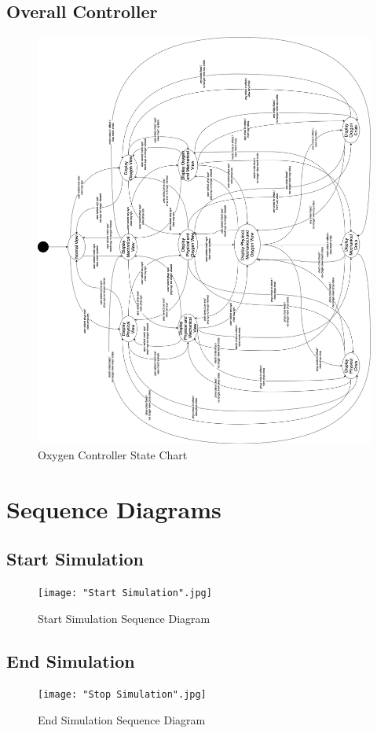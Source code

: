 \documentclass[12pt, titlepage]{article}
\begin{document}
\subsection{Overall Controller}
\newpage
\begin{figure}[H]

\centering
\includegraphics[width=180mm]{OC.png}
\caption{Oxygen Controller State Chart}
\end{figure}

\section{Sequence Diagrams}
\label{sec:sequence_diagrams}
\subsection*{Start Simulation}
\begin{figure}[H]
\centering
\texttt{[image: "Start Simulation".jpg]}
\caption{Start Simulation Sequence Diagram}
\end{figure}
\subsection*{End Simulation}
\begin{figure}[H]
\centering
\texttt{[image: "Stop Simulation".jpg]}
\caption{End Simulation Sequence Diagram}
\end{figure}
\end{document}
